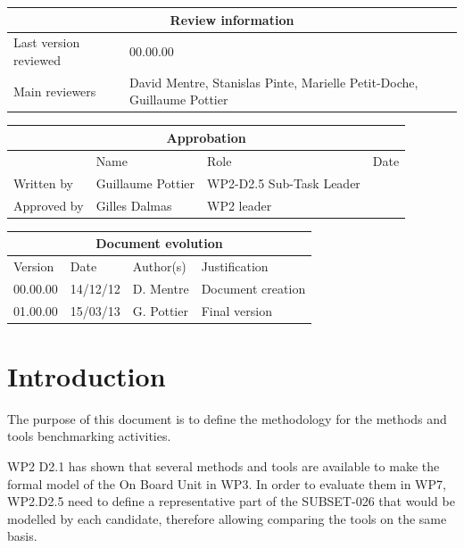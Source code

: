 \documentclass{template/openetcs_report}
\begin{document}
\begin{tabular}{|p{4.4cm}|p{8.7cm}|}
\hline
\multicolumn{2}{|c|}{Review information} \\
\hline
Last version reviewed & 00.00.00 \\
\hline
Main reviewers &  David Mentre, Stanislas Pinte, Marielle Petit-Doche, Guillaume Pottier \\
\hline
\end{tabular}

\begin{tabular}{|p{2.2cm}|p{4cm}|p{4cm}|p{2cm}|}
\hline
\multicolumn{4}{|c|}{Approbation} \\
\hline
  &  Name & Role & Date   \\
\hline  
Written by    &  Guillaume Pottier & WP2-D2.5 Sub-Task Leader  & \\
\hline
Approved by & Gilles Dalmas & WP2 leader & \\
\hline
\end{tabular}

\begin{tabular}{|p{2.2cm}|p{2cm}|p{3cm}|p{5cm}|}
\hline
\multicolumn{4}{|c|}{Document evolution} \\
\hline
Version &  Date & Author(s) & Justification  \\
\hline  
00.00.00 & 14/12/12 & D. Mentre &  Document creation  \\
\hline  
01.00.00 & 15/03/13 & G. Pottier &  Final version  \\
\hline
\end{tabular}



\tableofcontents
\listoffiguresandtables




\mainmatter

\chapter{Introduction}

The purpose of this document is to define the methodology for the methods and tools benchmarking activities. 

WP2 D2.1 has shown that several methods and tools are available to make the formal model of the On Board Unit in WP3. In order to evaluate them in WP7, WP2.D2.5 need to define a representative part of the SUBSET-026 that would be modelled by each candidate, therefore allowing comparing the tools on the same basis.
\end{document}
